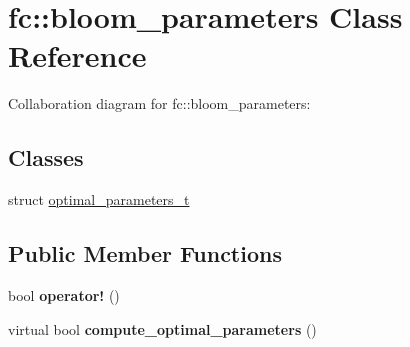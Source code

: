 \hypertarget{classfc_1_1bloom__parameters}{}\section{fc\+:\+:bloom\+\_\+parameters Class Reference}
\label{classfc_1_1bloom__parameters}


Collaboration diagram for fc\+:\+:bloom\+\_\+parameters\+:
\subsection*{Classes}
\begin{DoxyCompactItemize}
\item 
struct \mbox{\hyperlink{structfc_1_1bloom__parameters_1_1optimal__parameters__t}{optimal\+\_\+parameters\+\_\+t}}
\end{DoxyCompactItemize}
\subsection*{Public Member Functions}
\begin{DoxyCompactItemize}
\item 
\mbox{\label{classfc_1_1bloom__parameters_a025f422def06d21c3c81f7fdcfe7d2fd}} 
bool {\bfseries operator!} ()
\item 
\mbox{\label{classfc_1_1bloom__parameters_a9326bb497296d12119fd1f55bd5273b3}} 
virtual bool {\bfseries compute\+\_\+optimal\+\_\+parameters} ()
\end{DoxyCompactItemize}
